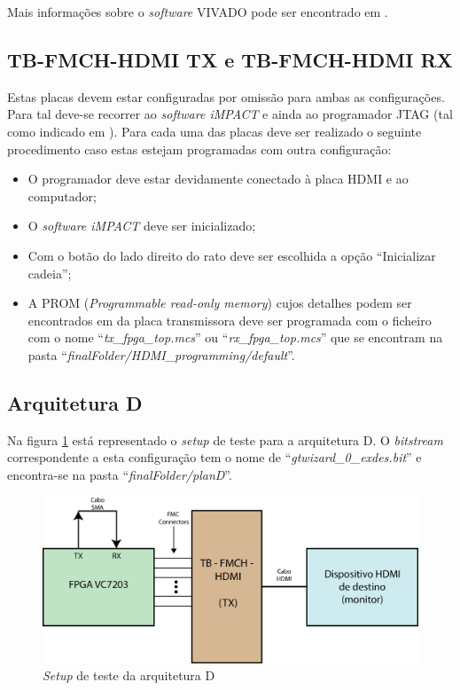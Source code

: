 \documentclass[11pt,a4paper]{article}
\begin{document}
	Mais informações sobre o \textit{software} VIVADO pode ser encontrado em \cite{R019}.
	
	\subsection{TB-FMCH-HDMI TX e TB-FMCH-HDMI RX}
	Estas placas devem estar configuradas por omissão para ambas as configurações. Para tal deve-se recorrer ao \textit{software iMPACT} e ainda ao programador JTAG (tal como indicado em \cite{R025}). Para cada uma das placas deve ser realizado o seguinte procedimento caso estas estejam programadas com outra configuração:
	
	\begin{itemize}
		\item O programador deve estar devidamente conectado à placa HDMI e ao computador;
		\item O \textit{software iMPACT} deve ser inicializado;
		\item Com o botão do lado direito do rato deve ser escolhida a opção ``Inicializar cadeia'';
		\item A PROM (\textit{Programmable read-only memory}) cujos detalhes podem ser encontrados em \cite{R026} da placa transmissora deve ser programada com o ficheiro com o nome ``\textit{tx\_fpga\_top.mcs}'' ou ``\textit{rx\_fpga\_top.mcs}'' que se encontram na pasta  ``\textit{finalFolder/HDMI\_programming/default}''.
	\end{itemize}
	
	\subsection{Arquitetura D}
		Na figura \ref{fig:setupD} está representado o \textit{setup} de teste para a arquitetura D. O \textit{bitstream} correspondente a esta configuração tem o nome de ``\textit{gtwizard\_0\_exdes.bit}'' e encontra-se na pasta ``\textit{finalFolder/planD}''.
			\begin{figure}[h!]
			\begin{center}
				\includegraphics[width=1.0\textwidth]{planDsch} 
				\caption{\textit{Setup} de teste da arquitetura D}
				\label{fig:setupD}
			\end{center}
		\end{figure}
\end{document}
